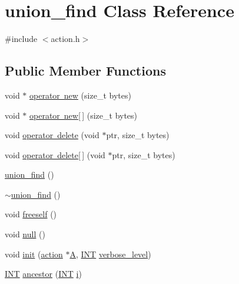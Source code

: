 \hypertarget{classunion__find}{}\section{union\+\_\+find Class Reference}
\label{classunion__find}


{\ttfamily \#include $<$action.\+h$>$}

\subsection*{Public Member Functions}
\begin{DoxyCompactItemize}
\item 
void $\ast$ \mbox{\hyperlink{classunion__find_ad7038446fd354936d5c5c8377a3a9627}{operator new}} (size\+\_\+t bytes)
\item 
void $\ast$ \mbox{\hyperlink{classunion__find_a3f08bf34a0bcc0aabc97b9b478cff6bc}{operator new\mbox{[}$\,$\mbox{]}}} (size\+\_\+t bytes)
\item 
void \mbox{\hyperlink{classunion__find_ab3e80756b80b3dc843f67023da85bd50}{operator delete}} (void $\ast$ptr, size\+\_\+t bytes)
\item 
void \mbox{\hyperlink{classunion__find_a619b48026730994f7db0485a7109a528}{operator delete\mbox{[}$\,$\mbox{]}}} (void $\ast$ptr, size\+\_\+t bytes)
\item 
\mbox{\hyperlink{classunion__find_a34893703c1c2b0168c1a52f5fa67ab46}{union\+\_\+find}} ()
\item 
\mbox{\hyperlink{classunion__find_af04d05ec9b34cb0aa232d50c04efb137}{$\sim$union\+\_\+find}} ()
\item 
void \mbox{\hyperlink{classunion__find_affeea0e4bdd8536f6fde8a52d19b5214}{freeself}} ()
\item 
void \mbox{\hyperlink{classunion__find_a465f199e41e130e6de65c429cda3cb18}{null}} ()
\item 
void \mbox{\hyperlink{classunion__find_aa5570ce2160988e7ea7de8b2b8756f70}{init}} (\mbox{\hyperlink{classaction}{action}} $\ast$\mbox{\hyperlink{classunion__find_ae5239695ba43f51fd2984ed7cf4922cf}{A}}, \mbox{\hyperlink{galois_8h_a09fddde158a3a20bd2dcadb609de11dc}{I\+NT}} \mbox{\hyperlink{simeon_8_c_a818073fbcc2f439e7c56952f67386122}{verbose\+\_\+level}})
\item 
\mbox{\hyperlink{galois_8h_a09fddde158a3a20bd2dcadb609de11dc}{I\+NT}} \mbox{\hyperlink{classunion__find_a22f99b0522ca36b2d8fd31b12c145bfc}{ancestor}} (\mbox{\hyperlink{galois_8h_a09fddde158a3a20bd2dcadb609de11dc}{I\+NT}} \mbox{\hyperlink{alphabet2_8_c_acb559820d9ca11295b4500f179ef6392}{i}})

\end{DoxyCompactItemize}
